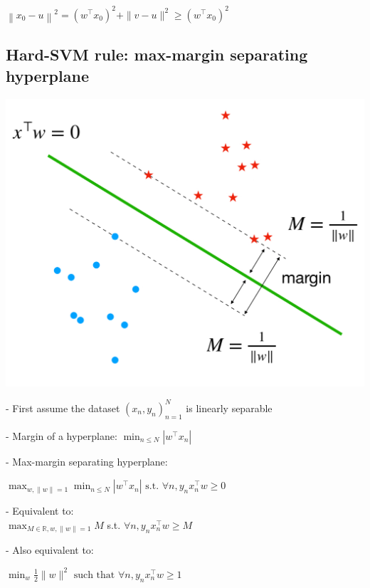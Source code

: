 $\left\|x_{0}-u\right\|^{2}=\left(w^{\top} x_{0}\right)^{2}+\|v-u\|^{2} \geq\left(w^{\top} x_{0}\right)^{2}$


\subsection*{Hard-SVM rule: max-margin separating hyperplane}

  \includegraphics[width=0.8\columnwidth]{figures/hard_svm.jpeg}

- First assume the dataset $\left(x_{n}, y_{n}\right)_{n=1}^{N}$ is linearly separable

- Margin of a hyperplane: $\min _{n \leq N}\left|w^{\top} x_{n}\right|$

- Max-margin separating hyperplane:

$
\max _{w,\|w\|=1} \min _{n \leq N}\left|w^{\top} x_{n}\right| \text { s.t. } \forall n, y_{n} x_{n}^{\top} w \geq 0
$

- Equivalent to: \\$\max _{M \in \mathbb{R}, w,\|w\|=1} M$ s.t. $\forall n, y_{n} x_{n}^{\top} w \geq M$

- Also equivalent to:

$
\min _{w} \frac{1}{2}\|w\|^{2} \text { such that } \forall n, y_{n} x_{n}^{\top} w \geq 1
$


